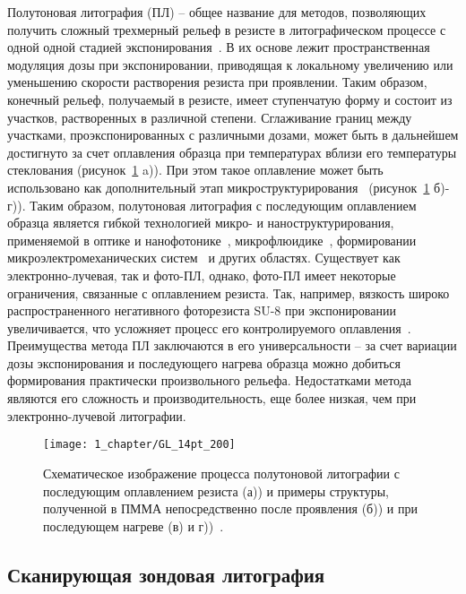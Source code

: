 Полутоновая литография (ПЛ) -- общее название для методов, позволяющих получить сложный трехмерный рельеф в резисте в литографическом процессе с одной одной стадией экспонирования~\cite{GL_general}. В их основе лежит пространственная модуляция дозы при экспонировании, приводящая к локальному увеличению или уменьшению скорости растворения резиста при проявлении. Таким образом, конечный рельеф, получаемый в резисте, имеет ступенчатую форму и состоит из участков, растворенных в различной степени. Сглаживание границ между участками, проэкспонированных с различными дозами, может быть в дальнейшем достигнуто за счет оплавления образца при температурах вблизи его температуры стеклования (рисунок~\ref{fig:GL} a)). При этом такое оплавление может быть использовано как дополнительный этап микроструктурирования~\cite{Kirchner_reflow} (рисунок~\ref{fig:GL} б)-г)). Таким образом, полутоновая литография с последующим оплавлением образца является гибкой технологией микро- и наноструктурирования, применяемой в оптике и нанофотонике~\cite{GL_optics}, микрофлюидике~\cite{GL_microfluidics}, формировании микроэлектромеханических систем~\cite{GL_MEMS} и других областях. Существует как электронно-лучевая, так и фото-ПЛ, однако, фото-ПЛ имеет некоторые ограничения, связанные с оплавлением резиста. Так, например, вязкость широко распространенного негативного фоторезиста SU-8 при экспонировании увеличивается, что усложняет процесс его контролируемого оплавления~\cite{Kirchner_GL_review}. Преимущества метода ПЛ заключаются в его универсальности -- за счет вариации дозы экспонирования и последующего нагрева образца можно добиться формирования практически произвольного рельефа. Недостатками метода являются его сложность и производительность, еще более низкая, чем при электронно-лучевой литографии.

\begin{figure}[t]
	\centering
	\texttt{[image: 1\_chapter/GL\_14pt\_200]}
	\vspace{1em}
	\caption{Схематическое изображение процесса полутоновой литографии с последующим оплавлением резиста (а)) и примеры структуры, полученной в ПММА непосредственно после проявления (б)) и при последующем нагреве (в) и г))~\cite{Kirchner_reflow}.}
	\label{fig:GL}
\end{figure}


\subsection{Сканирующая зондовая литография}

